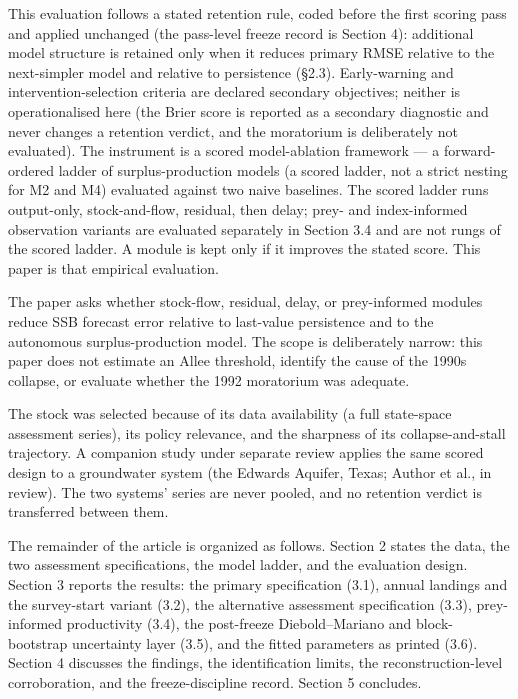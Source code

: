 \documentclass[11pt]{article}
\begin{document}
This evaluation follows a stated retention rule, coded before the first
scoring pass and applied unchanged (the pass-level freeze record is
Section 4): additional model structure is retained only when it reduces
primary RMSE relative to the next-simpler model and relative to
persistence (\S{}2.3). Early-warning and intervention-selection criteria
are declared secondary objectives; neither is operationalised here (the
Brier score is reported as a secondary diagnostic and never changes a
retention verdict, and the moratorium is deliberately not evaluated).
The instrument is a scored model-ablation framework --- a
forward-ordered ladder of surplus-production models (a scored ladder,
not a strict nesting for M2 and M4) evaluated against two naive
baselines. The scored ladder runs output-only, stock-and-flow,
residual, then delay; prey- and index-informed observation variants are
evaluated separately in Section 3.4 and are not rungs of the scored
ladder. A module is kept only if it improves the stated
score. This paper is that empirical evaluation.

The paper asks whether stock-flow, residual, delay, or prey-informed
modules reduce SSB forecast error relative to last-value persistence and
to the autonomous surplus-production model. The scope is deliberately
narrow: this paper does not estimate an Allee threshold, identify the
cause of the 1990s collapse, or evaluate whether the 1992 moratorium was
adequate.

The stock was selected because of its data availability (a full
state-space assessment series), its policy relevance, and the sharpness
of its collapse-and-stall trajectory. A companion study under separate
review applies the same scored design to a groundwater system (the
Edwards Aquifer, Texas; Author et al., in review). The two systems'
series are never pooled, and no retention verdict is transferred between
them.

The remainder of the article is organized as follows. Section 2 states
the data, the two assessment specifications, the model ladder, and the
evaluation design. Section 3 reports the results: the primary
specification (3.1), annual landings and the survey-start variant (3.2),
the alternative assessment specification (3.3), prey-informed
productivity (3.4), the post-freeze Diebold--Mariano and block-bootstrap
uncertainty layer (3.5), and the fitted parameters as printed (3.6).
Section 4 discusses the findings, the identification limits, the
reconstruction-level corroboration, and the freeze-discipline record.
Section 5 concludes.
\end{document}
